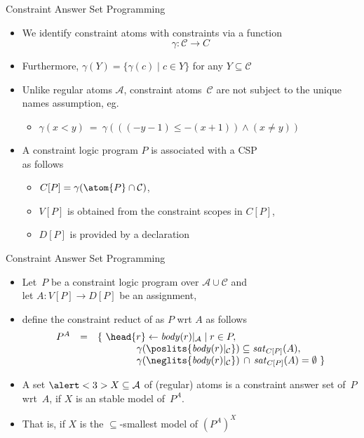 \begin{frame}{Constraint Answer Set Programming}
  \bigskip
  \begin{itemize}
  \item<1-> We identify constraint atoms with constraints via a function
    \[
    \gamma: \mathcal{C}\to C
    \]
  \item<1-> Furthermore,
    \(
    \gamma(Y)=\{\gamma(c)\mid c\in Y\}
    \)
    for any $Y\subseteq\mathcal{C}$
    \medskip
  \item<2-> 
    Unlike regular atoms $\mathcal{A}$, constraint atoms~$\mathcal{C}$
    are not subject to the unique names assumption, eg.\
    \begin{itemize}
    \item[] $\gamma(x<y) \ = \ \gamma(((-y-1)\leq -(x+1))\wedge (x\neq y))$
    \end{itemize}
    \medskip
  \item<3-> A constraint logic program $P$ is associated with a CSP\\
    as follows
    \begin{itemize}
    \item
      \(
      C[P]=\gamma(\atom{P}\cap\mathcal{C}) %
      \),
    \item $V[P]$ is obtained from the constraint scopes in $C[P]$,
    \item $D[P]$ is provided by a declaration
    \end{itemize}
  \end{itemize}
\end{frame}
\begin{frame}{Constraint Answer Set Programming}
  \begin{itemize}
  \item<1-> Let~$P$ be a constraint logic program over $\mathcal{A}\cup\mathcal{C}$ and \\
    let $A: V[P]\to D[P]$ be an assignment,

  \item<1-> [] define the \alert{constraint reduct} of as $P$ wrt $A$ as follows
    \[
    \begin{array}{rcl}
        P^A
        &=&
        \{\
        \head{r}\leftarrow\abody{r}
        \mid r\in P,\\
      &&\qquad\qquad
      \gamma(\poslits{\cbody{r}})
      \subseteq\mathit{sat}_{C[P]}(A)
      ,\\
      &&\qquad\qquad
      \gamma(\neglits{\cbody{r}})
      \,\cap\,
      \mathit{sat}_{C[P]}(A)
      =
      \emptyset
      \ \}
    \end{array}
    \]
  \item<2-> A set $\alert<3>{X}\subseteq\mathcal{A}$ of (regular) atoms
    is a \alert{constraint answer set} of~$P$ \alert<3>{wrt~$A$}, if
    $X$ is an stable model of~$P^A$.\pause%
  \item<3->  \structure{Note}
    That is, if $X$ is the $\subseteq$-smallest model of $(P^A)^X$
  \end{itemize}
\end{frame}
